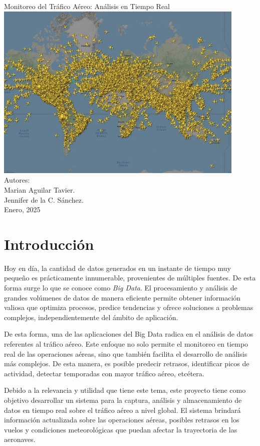 \documentclass{article}
\begin{document}
\begin{titlepage}
    \centering
    \vfill
    \Huge Monitoreo del Tráfico Aéreo: Análisis en Tiempo Real\\[1cm]
    \includegraphics[width=0.9\textwidth]{presentation.jpg}  
    \vfill
    \Large Autores: \\Marian Aguilar Tavier. \\  Jennifer de la C. Sánchez. \\[1cm]
    \Large Enero, 2025
    \vfill
\end{titlepage}
\tableofcontents
\newpage
\setcounter{secnumdepth}{0}

\section{Introducción}
Hoy en día, la cantidad de datos generados en un instante de tiempo muy pequeño es prácticamente innumerable, provenientes de múltiples fuentes. De esta forma surge lo que se conoce como \textit{Big Data}.
El procesamiento y análisis de grandes volúmenes de datos de manera eficiente permite obtener información valiosa que optimiza procesos, predice tendencias y ofrece soluciones a problemas complejos, independientemente del ámbito de aplicación.

De esta forma, una de las aplicaciones del Big Data radica en el análisis de datos referentes al tráfico aéreo. Este enfoque no solo permite el monitoreo en tiempo real de las operaciones aéreas, sino que también facilita el desarrollo de análisis más complejos. De esta manera, es posible predecir retrasos, identificar picos de actividad, detectar temporadas con mayor tráfico aéreo, etcétera.

Debido a la relevancia y utilidad que tiene este tema, este proyecto tiene como objetivo desarrollar un sistema para la captura, análisis y almacenamiento de datos en tiempo real sobre el tráfico aéreo a nivel global. El sistema brindará información actualizada sobre las operaciones aéreas, posibles retrasos en los vuelos y condiciones meteorológicas que puedan afectar la trayectoria de las aeronaves.  
\end{document}
